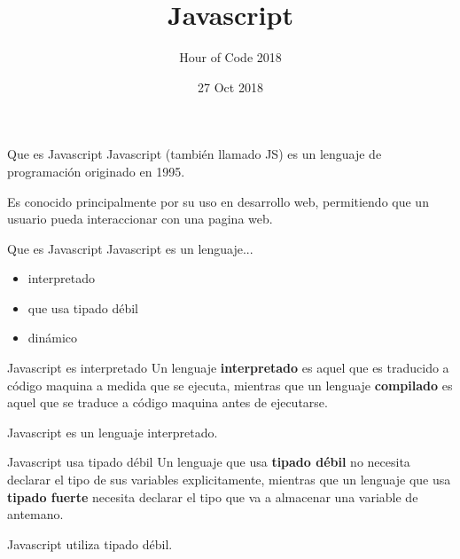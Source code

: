 \documentclass{beamer}
\title{Javascript}
\subtitle{Hour of Code 2018}
\institute{Universidad de Valladolid}
\date{27 Oct 2018}
\begin{document}
\begin{frame}
        \maketitle
\end{frame}
    \setlength{\parskip}{\baselineskip}%
    \setlength{\parindent}{0pt}%

\begin{frame}{Que es Javascript}
    	\pause
        Javascript (también llamado JS) es un lenguaje de programación originado en 1995.\pause

    	Es conocido principalmente por su uso en desarrollo web, permitiendo que un usuario pueda interaccionar con una pagina web.
\end{frame}
\begin{frame}{Que es Javascript}
        Javascript es un lenguaje... \bigskip
        \begin{itemize}
            \item interpretado\pause
            \item que usa tipado débil\pause
            \item dinámico
    \end{itemize}
\end{frame}
    
\begin{frame}{Javascript es interpretado}
        \pause
        Un lenguaje \textbf{interpretado} es aquel que es traducido a código maquina a medida que se ejecuta, mientras que un lenguaje \textbf{compilado} es aquel que se traduce a código maquina antes de ejecutarse.\pause
        \centering
        
        Javascript es un lenguaje interpretado.
\end{frame}
    
\begin{frame}{Javascript usa tipado débil}
        \pause
        Un lenguaje que usa \textbf{tipado débil} no necesita declarar el tipo de sus variables explicitamente, mientras que un lenguaje que usa \textbf{tipado fuerte} necesita declarar el tipo que va a almacenar una variable de antemano.\pause
        \centering
        
        Javascript utiliza tipado débil.
\end{frame}
    
    
    
\end{document}
